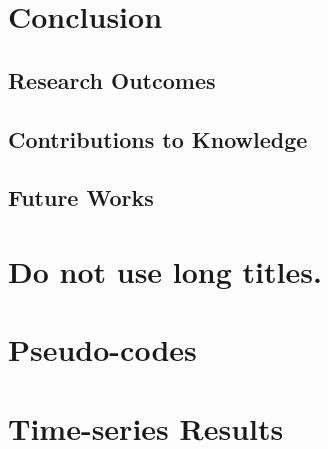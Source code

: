 \documentclass{utmthesis}
\begin{document}
\chapter{Conclusion}
\section{Research Outcomes}
\section{Contributions to Knowledge}
\section{Future Works}






\appendix
\chapter{Do not use long titles.}

\chapter{Pseudo-codes}

\chapter{Time-series Results}

\endmatter
\end{document}

